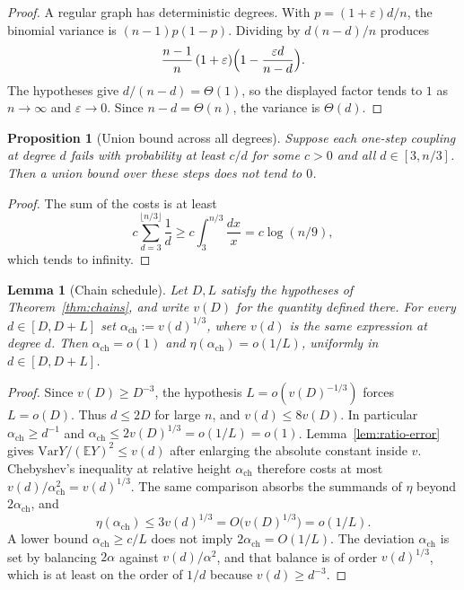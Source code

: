 \documentclass[11pt]{article}
\newtheorem{lemma}[theorem]{Lemma}
\newtheorem{proposition}[theorem]{Proposition}
\newcommand{\EE}{\mathbb{E}}
\newcommand{\Var}{\mathrm{Var}}
\begin{document}
\begin{proof}
A regular graph has deterministic degrees.
With \(p=(1+\varepsilon)d/n\), the binomial variance is \((n-1)p(1-p)\).
Dividing by \(d(n-d)/n\) produces
\[
\frac{n-1}{n}\,(1+\varepsilon)\Bigl(1-\frac{\varepsilon d}{n-d}\Bigr).
\]
The hypotheses give \(d/(n-d)=\Theta(1)\), so the displayed factor tends to \(1\) as \(n\to\infty\) and \(\varepsilon\to 0\).
Since \(n-d=\Theta(n)\), the variance is \(\Theta(d)\).
\end{proof}

\begin{proposition}[Union bound across all degrees]
\label{prop:harmonic}
Suppose each one-step coupling at degree \(d\) fails with probability at least \(c/d\)
for some \(c>0\) and all \(d\in[3,n/3]\). Then a union bound over these steps does
not tend to \(0\).
\end{proposition}

\begin{proof}
The sum of the costs is at least
\[
c\sum_{d=3}^{\lfloor n/3\rfloor}\frac1d
\ge
c\int_{3}^{n/3}\frac{dx}{x}
=
c\log(n/9),
\]
which tends to infinity.
\end{proof}

\begin{lemma}[Chain schedule]
\label{lem:chain-eta}
Let \(D,L\) satisfy the hypotheses of Theorem~\ref{thm:chains}, and write \(v(D)\)
for the quantity defined there.
For every \(d\in[D,D+L]\) set \(\alpha_{\mathrm{ch}}:=v(d)^{1/3}\), where \(v(d)\)
is the same expression at degree \(d\).
Then \(\alpha_{\mathrm{ch}}=o(1)\) and \(\eta(\alpha_{\mathrm{ch}})=o(1/L)\), uniformly in
\(d\in[D,D+L]\).
\end{lemma}

\begin{proof}
Since \(v(D)\ge D^{-3}\), the hypothesis \(L=o(v(D)^{-1/3})\) forces \(L=o(D)\).
Thus \(d\le 2D\) for large \(n\), and \(v(d)\le 8v(D)\).
In particular \(\alpha_{\mathrm{ch}}\ge d^{-1}\) and
\(\alpha_{\mathrm{ch}}\le 2v(D)^{1/3}=o(1/L)=o(1)\).
Lemma~\ref{lem:ratio-error} gives
\(\Var Y/(\EE Y)^2\le v(d)\) after enlarging the absolute constant inside \(v\).
Chebyshev's inequality at relative height \(\alpha_{\mathrm{ch}}\) therefore costs at most
\(v(d)/\alpha_{\mathrm{ch}}^2=v(d)^{1/3}\).
The same comparison absorbs the summands of \(\eta\) beyond \(2\alpha_{\mathrm{ch}}\), and
\[
\eta(\alpha_{\mathrm{ch}})
\le 3v(d)^{1/3}
=O\bigl(v(D)^{1/3}\bigr)
=o(1/L).
\]
A lower bound \(\alpha_{\mathrm{ch}}\ge c/L\) does not imply
\(2\alpha_{\mathrm{ch}}=O(1/L)\). The deviation \(\alpha_{\mathrm{ch}}\) is set by balancing
\(2\alpha\) against \(v(d)/\alpha^2\), and that balance is of order \(v(d)^{1/3}\), which
is at least on the order of \(1/d\) because \(v(d)\ge d^{-3}\).
\end{proof}
\end{document}

